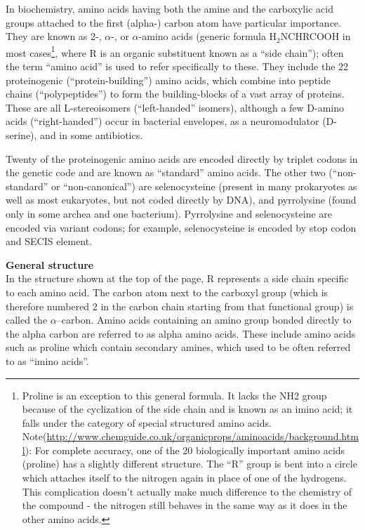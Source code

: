 In biochemistry, amino acids having both the amine and the carboxylic acid groups attached to the first (alpha-) carbon atom have particular importance. They are known as 2-, $\alpha$-, or $\alpha$-amino acids (generic formula H$_2$NCHRCOOH in most cases\footnote{Proline is an exception to this general formula. It lacks the NH2 group because of the cyclization of the side chain and is known as an imino acid; it falls under the category of special structured amino acids. Note(\url{http://www.chemguide.co.uk/organicprops/aminoacids/background.html}):  For complete accuracy, one of the 20 biologically important amino acids (proline) has a slightly different structure. The ``R'' group is bent into a circle which attaches itself to the nitrogen again in place of one of the hydrogens. This complication doesn't actually make much difference to the chemistry of the compound - the nitrogen still behaves in the same way as it does in the other amino acids.}, where R is an organic substituent known as a ``side chain''); often the term ``amino acid'' is used to refer specifically to these. They include the 22 proteinogenic (``protein-building'') amino acids, which combine into peptide chains (``polypeptides'') to form the building-blocks of a vast array of proteins. These are all L-stereoisomers (``left-handed'' isomers), although a few D-amino acids (``right-handed'') occur in bacterial envelopes, as a neuromodulator (D-serine), and in some antibiotics.

Twenty of the proteinogenic amino acids are encoded directly by triplet codons in the genetic code and are known as ``standard'' amino acids. The other two (``non-standard'' or ``non-canonical'') are selenocysteine (present in many prokaryotes as well as most eukaryotes, but not coded directly by DNA), and pyrrolysine (found only in some archea and one bacterium). Pyrrolysine and selenocysteine are encoded via variant codons; for example, selenocysteine is encoded by stop codon and SECIS element.

\textbf{General structure}\\
In the structure shown at the top of the page, R represents a side chain specific to each amino acid. The carbon atom next to the carboxyl group (which is therefore numbered 2 in the carbon chain starting from that functional group) is called the $\alpha$--carbon. Amino acids containing an amino group bonded directly to the alpha carbon are referred to as alpha amino acids. These include amino acids such as proline which contain secondary amines, which used to be often referred to as ``imino acids''.

